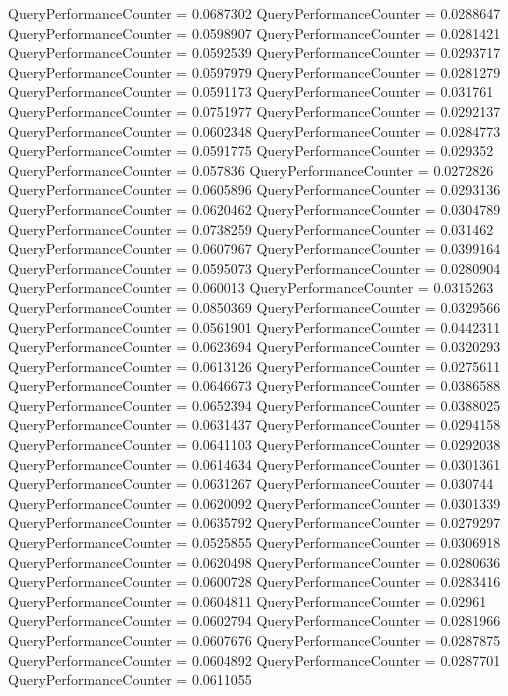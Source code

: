 \documentclass[9pt]{article}
\theoremstyle{plain}
\theoremstyle{definition}
\theoremstyle{remark}
\numberwithin{equation}{section}
\begin{document}
QueryPerformanceCounter  =  0.0687302
QueryPerformanceCounter  =  0.0288647
QueryPerformanceCounter  =  0.0598907
QueryPerformanceCounter  =  0.0281421
QueryPerformanceCounter  =  0.0592539
QueryPerformanceCounter  =  0.0293717
QueryPerformanceCounter  =  0.0597979
QueryPerformanceCounter  =  0.0281279
QueryPerformanceCounter  =  0.0591173
QueryPerformanceCounter  =  0.031761
QueryPerformanceCounter  =  0.0751977
QueryPerformanceCounter  =  0.0292137
QueryPerformanceCounter  =  0.0602348
QueryPerformanceCounter  =  0.0284773
QueryPerformanceCounter  =  0.0591775
QueryPerformanceCounter  =  0.029352
QueryPerformanceCounter  =  0.057836
QueryPerformanceCounter  =  0.0272826
QueryPerformanceCounter  =  0.0605896
QueryPerformanceCounter  =  0.0293136
QueryPerformanceCounter  =  0.0620462
QueryPerformanceCounter  =  0.0304789
QueryPerformanceCounter  =  0.0738259
QueryPerformanceCounter  =  0.031462
QueryPerformanceCounter  =  0.0607967
QueryPerformanceCounter  =  0.0399164
QueryPerformanceCounter  =  0.0595073
QueryPerformanceCounter  =  0.0280904
QueryPerformanceCounter  =  0.060013
QueryPerformanceCounter  =  0.0315263
QueryPerformanceCounter  =  0.0850369
QueryPerformanceCounter  =  0.0329566
QueryPerformanceCounter  =  0.0561901
QueryPerformanceCounter  =  0.0442311
QueryPerformanceCounter  =  0.0623694
QueryPerformanceCounter  =  0.0320293
QueryPerformanceCounter  =  0.0613126
QueryPerformanceCounter  =  0.0275611
QueryPerformanceCounter  =  0.0646673
QueryPerformanceCounter  =  0.0386588
QueryPerformanceCounter  =  0.0652394
QueryPerformanceCounter  =  0.0388025
QueryPerformanceCounter  =  0.0631437
QueryPerformanceCounter  =  0.0294158
QueryPerformanceCounter  =  0.0641103
QueryPerformanceCounter  =  0.0292038
QueryPerformanceCounter  =  0.0614634
QueryPerformanceCounter  =  0.0301361
QueryPerformanceCounter  =  0.0631267
QueryPerformanceCounter  =  0.030744
QueryPerformanceCounter  =  0.0620092
QueryPerformanceCounter  =  0.0301339
QueryPerformanceCounter  =  0.0635792
QueryPerformanceCounter  =  0.0279297
QueryPerformanceCounter  =  0.0525855
QueryPerformanceCounter  =  0.0306918
QueryPerformanceCounter  =  0.0620498
QueryPerformanceCounter  =  0.0280636
QueryPerformanceCounter  =  0.0600728
QueryPerformanceCounter  =  0.0283416
QueryPerformanceCounter  =  0.0604811
QueryPerformanceCounter  =  0.02961
QueryPerformanceCounter  =  0.0602794
QueryPerformanceCounter  =  0.0281966
QueryPerformanceCounter  =  0.0607676
QueryPerformanceCounter  =  0.0287875
QueryPerformanceCounter  =  0.0604892
QueryPerformanceCounter  =  0.0287701
QueryPerformanceCounter  =  0.0611055
\end{document}
